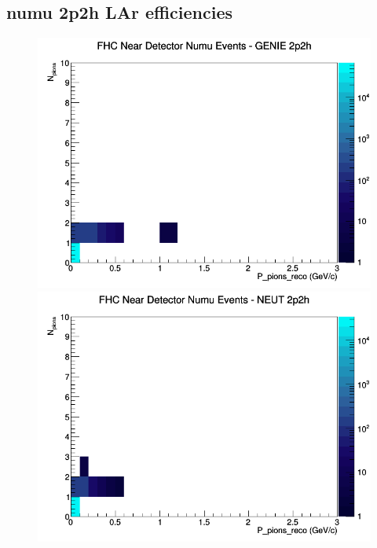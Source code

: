 \documentclass[12pt]{article}
\begin{document}
\subsection{numu 2p2h LAr efficiencies}
\begin{figure}[h]
\includegraphics[width=\linewidth]{eff_N_P/LAr/pions/2p2h_FHC_ND_numu_N_P_GENIE.png}
\endminipage
{}
\includegraphics[width=\linewidth]{eff_N_P/LAr/pions/2p2h_FHC_ND_numu_N_P_NEUT.png}
\endminipage
{}

\end{figure}
\end{document}
